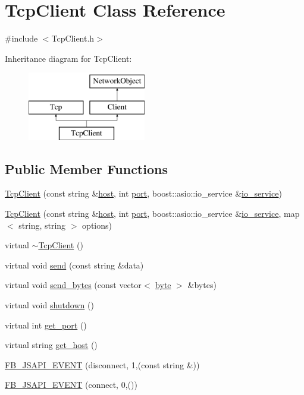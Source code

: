 \hypertarget{classTcpClient}{
\section{TcpClient Class Reference}
\label{classTcpClient}
}


{\ttfamily \#include $<$TcpClient.h$>$}

Inheritance diagram for TcpClient:\begin{figure}[H]
\begin{center}
\leavevmode
\includegraphics[height=3.000000cm]{classTcpClient}
\end{center}
\end{figure}
\subsection*{Public Member Functions}
\begin{DoxyCompactItemize}
\item 
\hyperlink{classTcpClient_aa1e96bd9ed563f3eaf022cc4e90f91c2}{TcpClient} (const string \&\hyperlink{classTcp_a0e981d15f94a460b91845bce9b930c61}{host}, int \hyperlink{classTcp_a7ed15f78afc9d0675404b4b41cc723ba}{port}, boost::asio::io\_\-service \&\hyperlink{classTcp_ad0c319a0974aa3f07e9c5ae290ea18b4}{io\_\-service})
\item 
\hyperlink{classTcpClient_a1d42085cbb76326fd3698e6924cfbe55}{TcpClient} (const string \&\hyperlink{classTcp_a0e981d15f94a460b91845bce9b930c61}{host}, int \hyperlink{classTcp_a7ed15f78afc9d0675404b4b41cc723ba}{port}, boost::asio::io\_\-service \&\hyperlink{classTcp_ad0c319a0974aa3f07e9c5ae290ea18b4}{io\_\-service}, map$<$ string, string $>$ options)
\item 
virtual \hyperlink{classTcpClient_a125d2277f401cbdebadb9689a5933e18}{$\sim$TcpClient} ()
\item 
virtual void \hyperlink{classTcpClient_a139cffd600eaf851c3560d73a1ba3a54}{send} (const string \&data)
\item 
virtual void \hyperlink{classTcpClient_a1d749cbc2e255d8d3204dfd2d2c58d5f}{send\_\-bytes} (const vector$<$ \hyperlink{Event_8h_ae0aa21f6bcb621fe36c2c962aa0452fe}{byte} $>$ \&bytes)
\item 
virtual void \hyperlink{classTcpClient_a1f0ae8f7c7c12530bc481b77ed984790}{shutdown} ()
\item 
virtual int \hyperlink{classTcpClient_a9caf99246bc1f36dcc69773077ddece8}{get\_\-port} ()
\item 
virtual string \hyperlink{classTcpClient_a4c1ecfdba951d559456c4066a73c8bf6}{get\_\-host} ()
\item 
\hyperlink{classTcpClient_a5275d221f99f3d9702841b461e36108c}{FB\_\-JSAPI\_\-EVENT} (disconnect, 1,(const string \&))
\item 
\hyperlink{classTcpClient_a651d1d61f19169b5755e1716b159eeb8}{FB\_\-JSAPI\_\-EVENT} (connect, 0,())
\end{DoxyCompactItemize}
